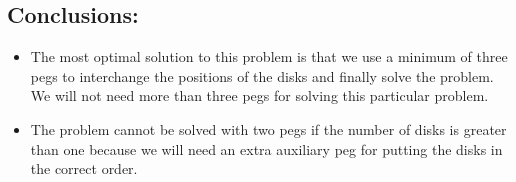 \documentclass[12pt,a4paper]{article}
\begin{document}
\subsection{Conclusions:}
\begin{itemize}
\item The most optimal solution to this problem is that we use a minimum of three pegs to interchange the positions of the disks and finally solve the problem. We will not need more than three pegs for solving this particular problem.
\item The problem cannot be solved with two pegs if the number of disks is greater than one because we will need an extra auxiliary peg for putting the disks in the correct order. 
\end{itemize}
\end{document}
